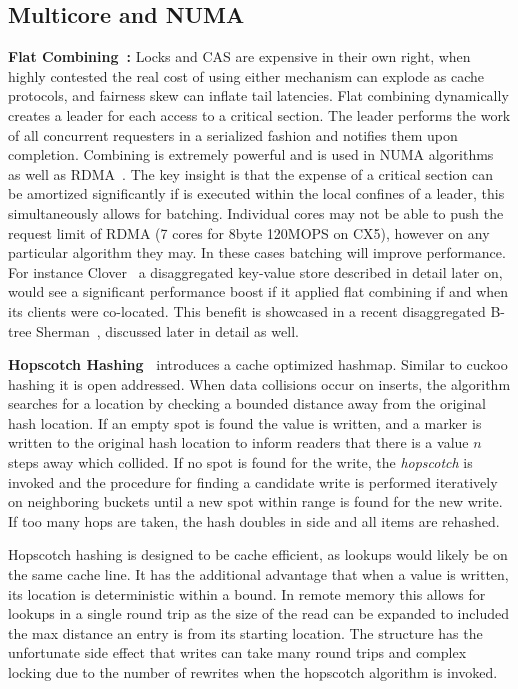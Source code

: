 \subsection{Multicore and NUMA}

\textbf{Flat Combining~\cite{flat-combine}:} Locks and CAS are expensive in
their own right, when highly contested the real cost of using either mechanism
can explode as cache protocols, and fairness skew can inflate tail latencies.
Flat combining dynamically creates a leader for each access to a critical
section.  The leader performs the work of all concurrent requesters in a
serialized fashion and notifies them upon completion. Combining is extremely
powerful and is used in NUMA algorithms~\cite{black-box-numa} as well as
RDMA~\cite{flock}. The key insight is that the expense of a critical section can
be amortized significantly if is executed within the local confines of a leader,
this simultaneously allows for batching. Individual cores may not be able to
push the request limit of RDMA (7 cores for 8byte 120MOPS on CX5), however on
any particular algorithm they may. In these cases batching will improve
performance. For instance Clover~\cite{clover} a disaggregated key-value store
described in detail later on, would see a significant performance boost if it
applied flat combining if and when its clients were co-located. This benefit is
showcased in a recent disaggregated B-tree Sherman~\cite{sherman}, discussed
later in detail as well.

\textbf{Hopscotch Hashing~\cite{hopscotch}} introduces a cache optimized
hashmap. Similar to cuckoo hashing it is open addressed. When data collisions
occur on inserts, the algorithm searches for a location by checking a
bounded distance away from the original hash location. If an empty spot is found the
value is written, and a marker is written to the original hash location to
inform readers that there is a value $n$ steps away which collided. If no spot
is found for the write, the \textit{hopscotch} is invoked and the procedure for
finding a candidate write is performed iteratively on neighboring buckets until
a new spot within range is found for the new write. If too many hops are taken,
the hash doubles in side and all items are rehashed.

Hopscotch hashing is designed to be cache efficient, as lookups would likely be
on the same cache line. It has the additional advantage that when a value is
written, its location is deterministic within a bound. In remote memory this
allows for lookups in a single round trip as the size of the read can be
expanded to included the max distance an entry is from its starting location.
The structure has the unfortunate side effect that writes can take many round
trips and complex locking due to the number of rewrites when the hopscotch
algorithm is invoked.


